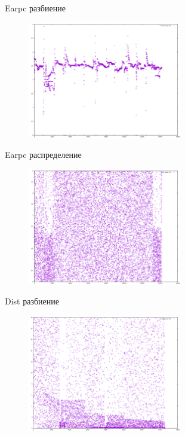 \documentclass[hyperref=unicode,graphics=pdflatex,13pt]{beamer}
\begin{document}
\begin{frame}{Earpc разбиение}
    \begin{figure}
        \centering
        \includegraphics[width=0.6\textwidth]{earpc_5.png}
    \end{figure}
\end{frame}

\begin{frame}{Earpc распределение}
    \begin{figure}
        \centering
        \includegraphics[width=0.6\textwidth]{earpc_dist_5.png}
    \end{figure}
\end{frame}

\begin{frame}{Dist разбиение}
    \begin{figure}
        \centering
        \includegraphics[width=0.6\textwidth]{dist_20.png}
    \end{figure}
\end{frame}
\end{document}
